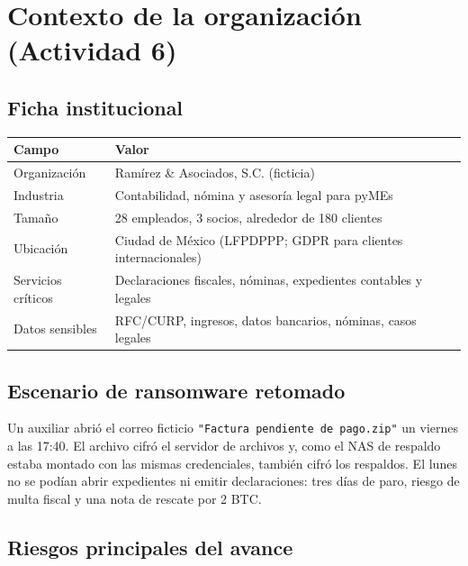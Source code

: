 \documentclass[letterpaper]{article}
\begin{document}
\section{Contexto de la organización (Actividad 6)}
\label{sec:orge7ac1f9}

\subsection{Ficha institucional}
\label{sec:orgf9e07a6}

\begin{center}
\begin{tabular}{ll}
Campo & Valor\\
\hline
Organización & Ramírez \& Asociados, S.C. (ficticia)\\
Industria & Contabilidad, nómina y asesoría legal para pyMEs\\
Tamaño & 28 empleados, 3 socios, alrededor de 180 clientes\\
Ubicación & Ciudad de México (LFPDPPP; GDPR para clientes internacionales)\\
Servicios críticos & Declaraciones fiscales, nóminas, expedientes contables y legales\\
Datos sensibles & RFC/CURP, ingresos, datos bancarios, nóminas, casos legales\\
\end{tabular}
\end{center}
\subsection{Escenario de ransomware retomado}
\label{sec:org2970314}

Un auxiliar abrió el correo ficticio \texttt{"Factura pendiente de pago.zip"} un viernes a
las 17:40. El archivo cifró el servidor de archivos y, como el NAS de respaldo estaba
montado con las mismas credenciales, también cifró los respaldos. El lunes no se
podían abrir expedientes ni emitir declaraciones: tres días de paro, riesgo de multa
fiscal y una nota de rescate por 2 BTC.
\subsection{Riesgos principales del avance}
\label{sec:orgdf90355}
\end{document}
